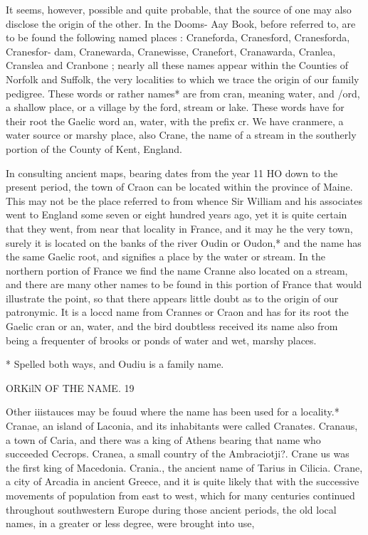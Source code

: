 It seems, however, possible and quite probable, that the source 
of one may also disclose the origin of the other. In the Dooms- 
Aay Book, before referred to, are to be found the following 
named places : Craneforda, Cranesford, Cranesforda, Cranesfor- 
dam, Cranewarda, Cranewisse, Cranefort, Cranawarda, Cranlea, 
Cranslea and Cranbone ; nearly all these names appear within the 
Counties of Norfolk and Suffolk, the very localities to which we 
trace the origin of our family pedigree. These words or rather 
names* are from cran, meaning water, and /ord, a shallow place, 
or a village by the ford, stream or lake. These words have for 
their root the Gaelic word an, water, with the prefix cr. We 
have cranmere, a water source or marshy place, also Crane, the 
name of a stream in the southerly portion of the County of Kent, 
England. 

In consulting ancient maps, bearing dates from the year 11 HO 
down to the present period, the town of Craon can be located 
within the province of Maine. This may not be the place referred 
to from whence Sir William and his associates went to England 
some seven or eight hundred years ago, yet it is quite certain that 
they went, from near that locality in France, and it may he the 
very town, surely it is located on the banks of the river Oudin or 
Oudon,* and the name has the same Gaelic root, and signifies a 
place by the water or stream. In the northern portion of France 
we find the name Cranne also located on a stream, and there are 
many other names to be found in this portion of France that 
would illustrate the point, so that there appears little doubt as to 
the origin of our patronymic. It is a loccd name from Crannes 
or Craon and has for its root the Gaelic cran or an, water, and 
the bird doubtless received its name also from being a frequenter 
of brooks or ponds of water and wet, marshy places. 

* Spelled both ways, and Oudiu is a family name. 



ORKilN OF THE NAME. 19 

Other iiistauces may be fouud where the name has been used 
for a locality.* Cranae, an island of Laconia, and its inhabitants 
were called Cranates. Cranaus, a town of Caria, and there was 
a king of Athens bearing that name who succeeded Cecrops. 
Cranea, a small country of the Ambraciotji?. Crane us was the 
first king of Macedonia. Crania., the ancient name of Tarius in 
Cilicia. Crane, a city of Arcadia in ancient Greece, and it is 
quite likely that with the successive movements of population 
from east to west, which for many centuries continued throughout 
southwestern Europe during those ancient periods, the old local 
names, in a greater or less degree, were brought into use, 

